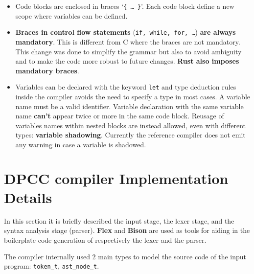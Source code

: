 \documentclass[a4paper]{article}
\begin{document}
\begin{itemize}
    \item Code blocks are enclosed in braces `\texttt{\{ \dots \ \}}'. Each code block define a new scope where variables can
        be defined.
    \item \textbf{Braces in control flow statements} (\texttt{if, while, for, \dots}) \textbf{are always mandatory}. This is different from C where the braces are not mandatory. This change was done to simplify the grammar but also to avoid ambiguity and to make the code more robust to future changes.
        \textbf{Rust also imposes mandatory braces}.

    \item Variables can be declared with the keyword \texttt{let} and type deduction rules inside the compiler avoids the need to specify a type in most cases. A variable name must be a valid identifier. Variable declaration with the same variable name \textbf{can't} appear twice or more in the same code block. Reusage of variables names within nested blocks are instead allowed, even with different types: \textbf{variable shadowing}. Currently the reference compiler does not emit any warning in case a variable is shadowed.

\end{itemize}

\clearpage
\section{DPCC compiler Implementation Details}

In this section it is briefly described the input stage, the lexer stage, and the syntax analysis stage (parser).
\textbf{Flex} and \textbf{Bison} are used as tools for aiding in the boilerplate code generation of respectively the lexer and the parser.

The compiler internally used 2 main types to model the source code of the input program: \texttt{token\_t}, \texttt{ast\_node\_t}.
\end{document}
